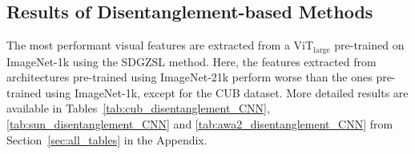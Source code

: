 % 
\subsection{Results of \textbf{Disentanglement}-based Methods} 

The most performant visual features are extracted from a ViT$_{\text{large}}$ pre-trained on ImageNet-1k using the SDGZSL method. 
Here, the features extracted from architectures pre-trained using ImageNet-21k perform worse than the ones pre-trained using ImageNet-1k, except for the CUB dataset.
More detailed results are available in Tables~\ref{tab:cub_disentanglement_CNN}, \ref{tab:sun_disentanglement_CNN} and \ref{tab:awa2_disentanglement_CNN} from Section~\ref{sec:all_tables} in the Appendix. 


